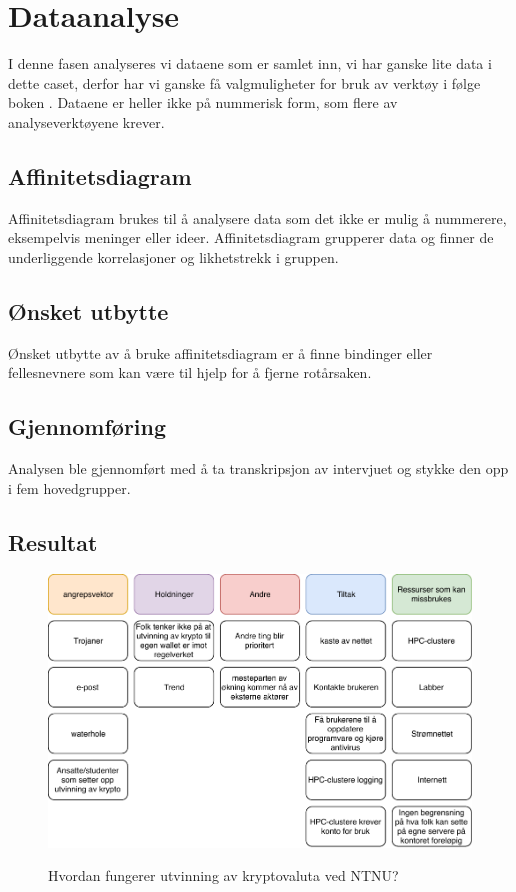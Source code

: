 \chapter{Dataanalyse}
I denne fasen analyseres vi dataene som er samlet inn, vi har ganske lite data i dette caset, derfor har vi ganske få valgmuligheter for bruk av verktøy i følge boken \cite{RCA}. Dataene er heller ikke på nummerisk form, som flere av analyseverktøyene krever.

\section{Affinitetsdiagram}
Affinitetsdiagram brukes til å analysere data som det ikke er mulig å nummerere, eksempelvis meninger eller ideer. Affinitetsdiagram grupperer data og finner de underliggende korrelasjoner og likhetstrekk i gruppen.


\section{Ønsket utbytte}
Ønsket utbytte av å bruke affinitetsdiagram er å finne bindinger eller fellesnevnere som kan være til hjelp for å fjerne rotårsaken. 

\section{Gjennomføring}
Analysen ble gjennomført med å ta transkripsjon av intervjuet og stykke den opp i fem hovedgrupper.     

\section{Resultat}

\begin{figure}[H]
    \centering
    \includegraphics[scale=0.6]{case_3/bilder/AD.pdf}
    \label{fig:AD_miner}
    \caption[Analyse av intervju]{Hvordan fungerer utvinning av kryptovaluta ved NTNU?}
\end{figure}

